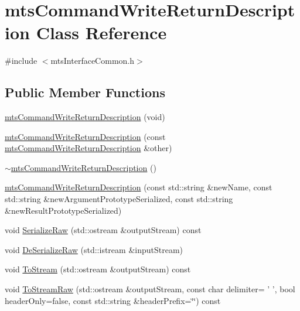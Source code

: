 \hypertarget{classmts_command_write_return_description}{\section{mts\-Command\-Write\-Return\-Description Class Reference}
\label{classmts_command_write_return_description}
}


{\ttfamily \#include $<$mts\-Interface\-Common.\-h$>$}

\subsection*{Public Member Functions}
\begin{DoxyCompactItemize}
\item 
\hyperlink{classmts_command_write_return_description_a61ecbd0e18dd8d82e84979b79381f051}{mts\-Command\-Write\-Return\-Description} (void)
\item 
\hyperlink{classmts_command_write_return_description_a30017af79f80cdf7e07b3e62700ebd05}{mts\-Command\-Write\-Return\-Description} (const \hyperlink{classmts_command_write_return_description}{mts\-Command\-Write\-Return\-Description} \&other)
\item 
\hyperlink{classmts_command_write_return_description_a386f923ae97f4929875f00952f666ff3}{$\sim$mts\-Command\-Write\-Return\-Description} ()
\item 
\hyperlink{classmts_command_write_return_description_a1579d40a25060142a0096af6fc6f8a05}{mts\-Command\-Write\-Return\-Description} (const std\-::string \&new\-Name, const std\-::string \&new\-Argument\-Prototype\-Serialized, const std\-::string \&new\-Result\-Prototype\-Serialized)
\item 
void \hyperlink{classmts_command_write_return_description_aa952a713a7b789c1c620f156765c4971}{Serialize\-Raw} (std\-::ostream \&output\-Stream) const 
\item 
void \hyperlink{classmts_command_write_return_description_a1a2afb9f95b96cb806fc3fd90466241f}{De\-Serialize\-Raw} (std\-::istream \&input\-Stream)
\item 
void \hyperlink{classmts_command_write_return_description_abe654d2466493cf4ac7e48956d0bde46}{To\-Stream} (std\-::ostream \&output\-Stream) const 
\item 
void \hyperlink{classmts_command_write_return_description_a362d3c984d6d8d2939c4b96e77cf36a0}{To\-Stream\-Raw} (std\-::ostream \&output\-Stream, const char delimiter= ' ', bool header\-Only=false, const std\-::string \&header\-Prefix=\char`\"{}\char`\"{}) const 

\end{DoxyCompactItemize}
